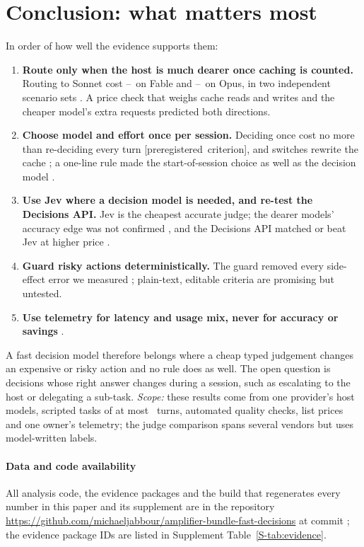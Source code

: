 \section{Conclusion: what matters most}\label{sec:conclusion}

In order of how well the evidence supports them:
\begin{enumerate}[leftmargin=1.6em]
  \item \textbf{Route only when the host is much dearer once caching is counted.} Routing to Sonnet cost
    \SHOneRatio--\CfFableSonnetArm\X\ on Fable and \SHFiveRatio--\CfOpusSonnetArm\X\ on Opus, in two independent scenario
    sets \prereg. A price check that weighs cache reads and writes and the cheaper model's extra requests predicted both
    directions.
  \item \textbf{Choose model and effort once per session.} Deciding once cost no more than re-deciding every turn
    \mbox{\textsf{\small\color{okblue}[preregistered criterion]}}, and switches rewrite the cache \expl; a one-line rule
    made the start-of-session choice as well as the decision model \prereg.
  \item \textbf{Use Jev where a decision model is needed, and re-test the Decisions API.} Jev is the cheapest
    accurate judge; the dearer models' accuracy edge was not confirmed \prereg, and the Decisions API matched or beat
    Jev at higher price \posthoc.
  \item \textbf{Guard risky actions deterministically.} The guard removed every side-effect error we measured
    \prereg; plain-text, editable criteria are promising but untested.
  \item \textbf{Use telemetry for latency and usage mix, never for accuracy or savings} \expl.
\end{enumerate}
A fast decision model therefore belongs where a cheap typed judgement changes an expensive or risky action and no rule
does as well. The open question is decisions whose right answer changes during a session, such as escalating to the
host or delegating a sub-task. \emph{Scope:} these results come from one provider's host models, scripted tasks of at
most \MaxTurns\ turns, automated quality checks, list prices and one owner's telemetry; the judge comparison spans
several vendors but uses model-written labels.

\paragraph{Data and code availability} All analysis code, the evidence packages and the build that regenerates every
number in this paper and its supplement are in the repository
\url{https://github.com/michaeljabbour/amplifier-bundle-fast-decisions} at commit \RepoCommit; the evidence package IDs
are listed in Supplement Table~\ref{S-tab:evidence}.
